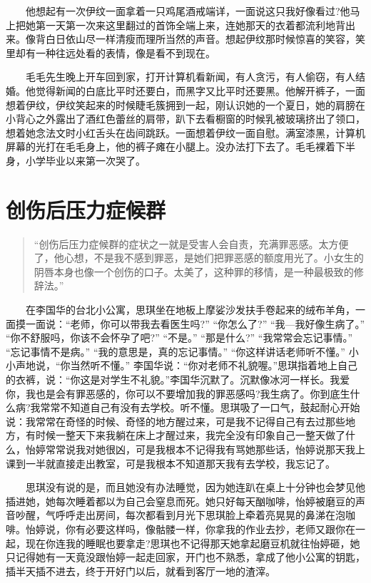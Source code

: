 \documentclass[12pt,UTF8]{ctexbook}
\begin{document}
　　他想起有一次伊纹一面拿着一只鸡尾酒戒端详，一面说这只我好像看过?他马上把她第一天第一次来这里翻过的首饰全端上来，连她那天的衣着都流利地背出来。像背白日依山尽一样清瘦而理所当然的声音。想起伊纹那时候惊喜的笑容，笑里却有一种往远处看的表情，像是看不到现在。

　　毛毛先生晚上开车回到家，打开计算机看新闻，有人贪污，有人偷窃，有人结婚。他觉得新闻的白底比平时还要白，而黑字又比平时还要黑。他解开裤子，一面想着伊纹，伊纹笑起来的时候睫毛簇拥到一起，刚认识她的一个夏日，她的肩膀在小背心之外露出了酒红色蕾丝的肩带，趴下去看橱窗的时候乳被玻璃挤出了领口，想着她念法文时小红舌头在齿间跳跃。一面想着伊纹一面自慰。满室漆黑，计算机屏幕的光打在毛毛身上，他的裤子瘫在小腿上。没办法打下去了。毛毛裸着下半身，小学毕业以来第一次哭了。

\hypertarget{ux521bux4f24ux540eux538bux529bux75c7ux5019ux7fa4}{%
\section*{创伤后压力症候群}\label{ux521bux4f24ux540eux538bux529bux75c7ux5019ux7fa4}}

\begin{quote}
\enquote{创伤后压力症候群的症状之一就是受害人会自责，充满罪恶感。太方便了，他心想，不是我不感到罪恶，是她们把罪恶感的额度用光了。小女生的阴唇本身也像一个创伤的口子。太美了，这种罪的移情，是一种最极致的修辞法。}
\end{quote}

　　在李国华的台北小公寓，思琪坐在地板上摩娑沙发扶手卷起来的绒布羊角，一面摸一面说：\enquote{老师，你可以带我去看医生吗?} \enquote{你怎么了?} \enquote{我---我好像生病了。} \enquote{你不舒服吗，你该不会怀孕了吧?} \enquote{不是。} \enquote{那是什么?} \enquote{我常常会忘记事情。} \enquote{忘记事情不是病。} \enquote{我的意思是，真的忘记事情。} \enquote{你这样讲话老师听不懂。} 小小声地说，\enquote{你当然听不懂。} 李国华说：\enquote{你对老师不礼貌喔。}思琪指着地上自己的衣裤，说：\enquote{你这是对学生不礼貌。}李国华沉默了。沉默像冰河一样长。我爱你，我也是会有罪恶感的，你可以不要增加我的罪恶感吗?我生病了。你到底生什么病?我常常不知道自己有没有去学校。听不懂。思琪吸了一口气，鼓起耐心开始说：我常常在奇怪的时候、奇怪的地方醒过来，可是我不记得自己有去过那些地方，有时候一整天下来我躺在床上才醒过来，我完全没有印象自己一整天做了什么，怡婷常常说我对她很凶，可是我根本不记得我有骂她那些话，怡婷说那天我上课到一半就直接走出教室，可是我根本不知道那天我有去学校，我忘记了。

　　思琪没有说的是，而且她没有办法睡觉，因为她连趴在桌上十分钟也会梦见他插进她，她每次睡着都以为自己会窒息而死。她只好每天酗咖啡，怡婷被磨豆的声音吵醒，气呼呼走出房间，每次都看到月光下思琪脸上牵着亮晃晃的鼻涕在泡咖啡。怡婷说，你有必要这样吗，像骷髅一样，你拿我的作业去抄，老师又跟你在一起，现在你连我的睡眠也要拿走?思琪也不记得那天她拿起磨豆机就往怡婷砸，她只记得她有一天竟没跟怡婷一起走回家，开门也不熟悉，拿成了他小公寓的钥匙，插半天插不进去，终于开好门以后，就看到客厅一地的渣滓。
\end{document}
